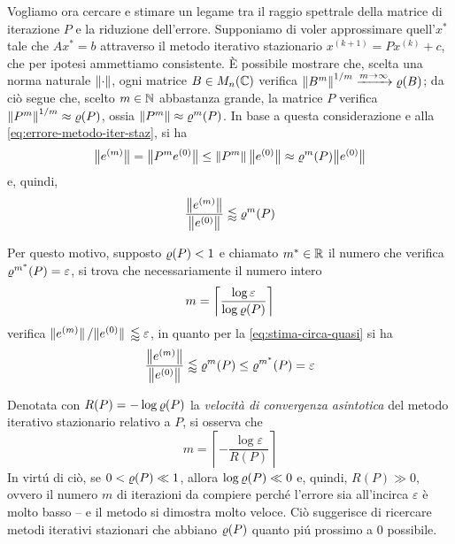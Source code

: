 	Vogliamo ora cercare e stimare un legame tra il raggio spettrale della matrice di iterazione \(P\) e la riduzione dell'errore. Supponiamo di voler approssimare quell'\(x^*\) tale che \(A x^* = b\) attraverso il metodo iterativo stazionario \(x^{(k + 1)} = P x^{(k)} + c\), che per ipotesi ammettiamo consistente. È possibile mostrare che, scelta una norma naturale \(\norm{\cdot}\), ogni matrice \(B \in M_n (\mathbb{C})\) verifica \(\norm{B^m}^{1 / m} \xrightarrow{m \to \infty} \operatorname{\varrho} (B)\); da ciò segue che, scelto \(m \in \mathbb{N}\) abbastanza grande, la matrice \(P\) verifica \(\norm{P^m}^{1 / m} \approx \operatorname{\varrho} (P)\), ossia \(\norm{P^m} \approx \operatorname{\varrho}^m (P)\). In base a questa considerazione e alla \eqref{eq:errore-metodo-iter-staz}, si ha
	\begin{equation*}
		\bigl\| e^{(m)} \bigr\| = \bigl\| P^m e^{(0)} \bigr\| \le \norm{P^m} \, \bigl\| e^{(0)} \bigr\| \approx \operatorname{\varrho}^m (P) \bigl\| e^{(0)} \bigr\|
	\end{equation*}
	e, quindi,
	\begin{equation}\label{eq:stima-circa-quasi}
		\frac{\bigl\| e^{(m)} \bigr\|}{\bigl\| e^{(0)} \bigr\|} \lessapprox \operatorname{\varrho}^m (P)
	\end{equation}
	
	Per questo motivo, supposto \(\operatorname{\varrho} (P) < 1\) e chiamato \(m^* \in \mathbb{R}\) il numero che verifica \(\operatorname{\varrho}^{m^*} (P) = \varepsilon\), si trova che necessariamente il numero intero
	\begin{equation*}
		m = \left\lceil \frac{\log \varepsilon}{\log \operatorname{\varrho} (P)} \right\rceil
	\end{equation*}
	verifica \(\norm*{e^{(m)}} / \norm*{e^{(0)}} \lessapprox \varepsilon\), in quanto per la \eqref{eq:stima-circa-quasi} si ha
	\begin{equation*}
		\frac{\bigl\| e^{(m)} \bigr\|}{\bigl\| e^{(0)} \bigr\|} \lessapprox \operatorname{\varrho}^m (P) \le \operatorname{\varrho}^{m^*} (P) = \varepsilon
	\end{equation*}
	
	Denotata con \(R (P) = - \log \operatorname{\varrho} (P)\) la \emph{velocità di convergenza asintotica} del metodo iterativo stazionario relativo a \(P\), si osserva che
	\begin{equation*}
		m = \left\lceil - \frac{\log \varepsilon}{R (P)} \right\rceil
	\end{equation*}
	In virtú di ciò, se \(0 < \operatorname{\varrho} (P) \ll 1\), allora \(\log \operatorname{\varrho} (P) \ll 0\) e, quindi, \(R (P) \gg 0\), ovvero il numero \(m\) di iterazioni da compiere perché l'errore sia all'incirca \(\varepsilon\) è molto basso -- e il metodo si dimostra molto veloce. Ciò suggerisce di ricercare metodi iterativi stazionari che abbiano \(\operatorname{\varrho} (P)\) quanto piú prossimo a \(0\) possibile.
	
